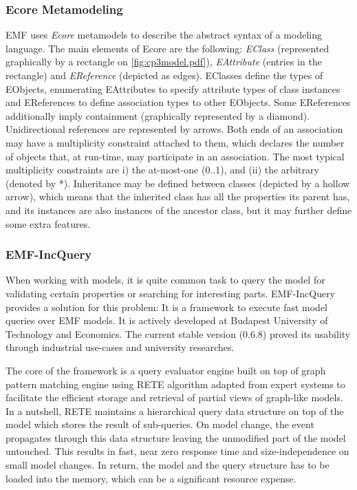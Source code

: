 \subsubsection{Ecore Metamodeling~\cite{MODELS10}}
EMF uses \emph{Ecore} metamodels to describe the abstract syntax of a modeling
language. The main elements of Ecore are the following: \emph{EClass}
(represented graphically by a rectangle on \autoref{fig:cp3model.pdf}),
\emph{EAttribute} (entries in the rectangle) and \emph{EReference} (depicted as
edges). EClasses define the types of EObjects, enumerating EAttributes to
specify attribute types of class instances and EReferences to define association
types to other EObjects. Some EReferences additionally imply containment
(graphically represented by a diamond).
Unidirectional references are represented by arrows. Both ends of an association
may have a multiplicity constraint attached to them, which declares the number
of objects that, at run-time, may participate in an association. The most
typical multiplicity constraints are i) the at-most-one (0..1), and (ii) the
arbitrary (denoted by *). Inheritance may be defined between classes (depicted
by a hollow arrow), which means that the inherited class has all the properties
its parent has, and its instances are also instances of the ancestor class, but
it may further define some extra features.


\subsubsection{EMF-IncQuery~\cite{icmt2011}} 

When working with models, it is quite common task to query the model for
validating certain properties or searching for interesting parts. EMF-IncQuery
\cite{EMFIncQuery} provides a solution for this problem: It is a framework to
execute fast model queries over EMF models. It is actively developed at Budapest
University of Technology and Economics. The current stable version  (0.6.8) 
proved its usability through industrial use-cases
and university researches.

The core of the framework is a query evaluator engine built on top of graph
pattern matching engine using RETE \cite{RETE} algorithm adapted from expert
systems to facilitate the efficient storage and retrieval of partial views of
graph-like models. In a nutshell, RETE maintains a hierarchical query data
structure on top of the model which stores the result of sub-queries. On model
change, the event propagates through this data structure leaving the unmodified
part of the model untouched. This results in fast, near zero response time and
size-independence on small model changes. In return, the model and the query
structure has to be loaded into the memory, which can be a significant resource
expense.

